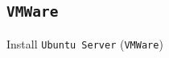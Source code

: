 \documentclass[aspectratio=169]{beamer}
\begin{document}
\subsection{\texttt{VMWare}}
\begin{frame}{Install \texttt{Ubuntu Server} (\texttt{VMWare})}
  \begin{center}
    \begin{figure}
      \begin{overprint}
        \setlength{\fboxsep}{0pt}%
        \setlength{\fboxrule}{0.5pt}%
        \centering{}
        \centering{}
        \centering{}
        \centering{}

\end{overprint}
\end{figure}
\end{center}
\end{frame}
\end{document}
